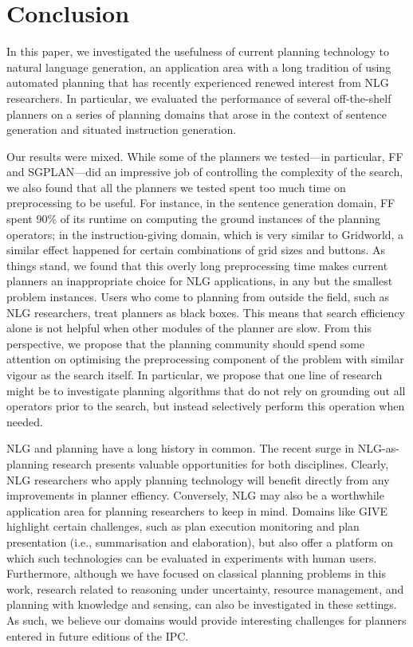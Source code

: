 \section{Conclusion}
\label{sec:conclusion}

In this paper, we investigated the usefulness of current planning technology
to natural language generation, an application area with a long tradition of
using automated planning that has recently experienced renewed interest from
NLG researchers. In particular, we evaluated the performance of several
off-the-shelf planners on a series of planning domains that arose in the
context of sentence generation and situated instruction generation.

Our results were mixed. While some of the planners we tested---in
particular, FF and SGPLAN---did an impressive job of controlling the
complexity of the search, we also found that all the planners we tested
spent too much time on preprocessing to be useful. For instance, in the
sentence generation domain, FF spent 90\% of its runtime on computing the
ground instances of the planning operators; in the instruction-giving
domain, which is very similar to Gridworld, a similar effect happened for
certain combinations of grid sizes and buttons. As things stand, we found
that this overly long preprocessing time makes current planners an
inappropriate choice for NLG applications, in any but the smallest problem
instances. Users who come to planning from outside the field, such as NLG
researchers, treat planners as black boxes. This means that search
efficiency alone is not helpful when other modules of the planner are slow.
From this perspective, we propose that the planning community should spend
some attention on optimising the preprocessing component of the problem with
similar vigour as the search itself. In particular, we propose that one line
of research might be to investigate planning algorithms that do not rely on
grounding out all operators prior to the search, but instead selectively
perform this operation when needed.

NLG and planning have a long history in common. The recent surge in
NLG-as-planning research presents valuable opportunities for both
disciplines. Clearly, NLG researchers who apply planning technology will
benefit directly from any improvements in planner effiency. Conversely, NLG
may also be a worthwhile application area for planning researchers to keep
in mind. Domains like GIVE highlight certain challenges, such as plan
execution monitoring and plan presentation (i.e., summarisation and
elaboration), but also offer a platform on which such technologies can be
evaluated in experiments with human users. Furthermore, although we have
focused on classical planning problems in this work, research related to
reasoning under uncertainty, resource management, and planning with
knowledge and sensing, can also be investigated in these settings. As such,
we believe our domains would provide interesting challenges for planners
entered in future editions of the IPC.


